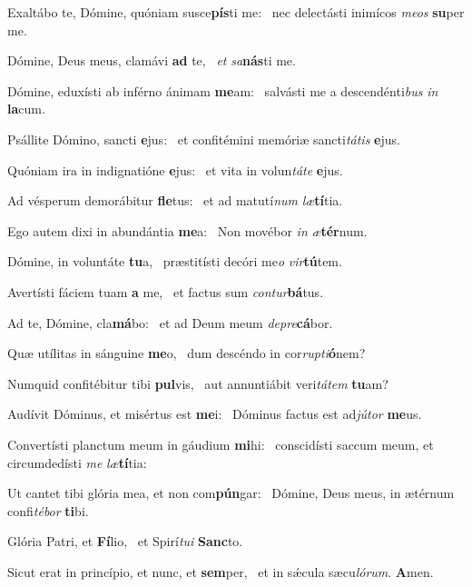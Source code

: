 \item Exaltábo te, Dómine, quóniam susce\textbf{pís}ti me:~\psstar{} nec delectásti inimícos \textit{meos} \textbf{su}per me.
\item Dómine, Deus meus, clamávi \textbf{ad} te,~\psstar{} \textit{et} \textit{sa}\textbf{nás}ti me.
\item Dómine, eduxísti ab inférno ánimam \textbf{me}am:~\psstar{} salvásti me a descendénti\textit{bus} \textit{in} \textbf{la}cum.
\item Psállite Dómino, sancti \textbf{e}jus:~\psstar{} et confitémini memóriæ sancti\textit{tátis} \textbf{e}jus.
\item Quóniam ira in indignatióne \textbf{e}jus:~\psstar{} et vita in volun\textit{táte} \textbf{e}jus.
\item Ad vésperum demorábitur \textbf{fle}tus:~\psstar{} et ad matutí\textit{num} \textit{læ}\textbf{tí}tia.
\item Ego autem dixi in abundántia \textbf{me}a:~\psstar{} Non movébor \textit{in} \textit{æ}\textbf{tér}num.
\item Dómine, in voluntáte \textbf{tu}a,~\psstar{} præstitísti decóri me\textit{o} \textit{vir}\textbf{tú}tem.
\item Avertísti fáciem tuam \textbf{a} me,~\psstar{} et factus sum \textit{contur}\textbf{bá}tus.
\item Ad te, Dómine, cla\textbf{má}bo:~\psstar{} et ad Deum meum \textit{depre}\textbf{cá}bor.
\item Quæ utílitas in sánguine \textbf{me}o,~\psstar{} dum descéndo in cor\textit{rupti}\textbf{ó}nem?
\item Numquid confitébitur tibi \textbf{pul}vis,~\psstar{} aut annuntiábit veri\textit{tátem} \textbf{tu}am?
\item Audívit Dóminus, et misértus est \textbf{me}i:~\psstar{} Dóminus factus est ad\textit{jútor} \textbf{me}us.
\item Convertísti planctum meum in gáudium \textbf{mi}hi:~\psstar{} conscidísti saccum meum, et circumdedísti \textit{me} \textit{læ}\textbf{tí}tia:
\item Ut cantet tibi glória mea, et non com\textbf{pún}gar:~\psstar{} Dómine, Deus meus, in ætérnum confi\textit{tébor} \textbf{ti}bi.
\item Glória Patri, et \textbf{Fí}lio,~\psstar{} et Spirí\textit{tui} \textbf{Sanc}to.
\item Sicut erat in princípio, et nunc, et \textbf{sem}per,~\psstar{} et in sǽcula sæcu\textit{lórum}. \textbf{A}men.
